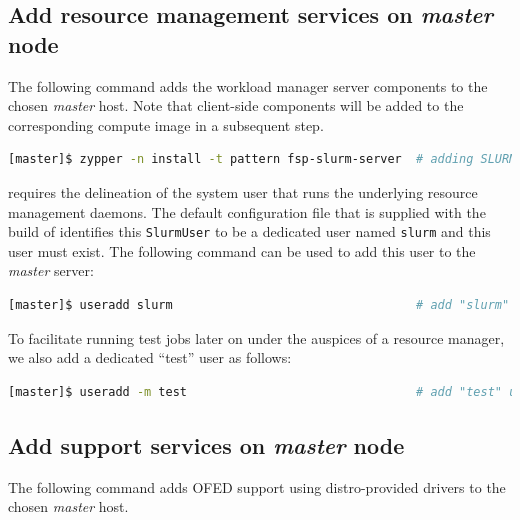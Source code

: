 \documentclass[letterpaper]{article}
\begin{document}
\subsection{Add resource management services on {\em master} node} \label{sec:add_rm}

The following command adds the \SLURM{} workload manager server components to the
chosen {\em master} host. Note that client-side components will be added to
the corresponding compute image in a subsequent step.

\begin{lstlisting}[language=bash,keywords={}]
[master]$ zypper -n install -t pattern fsp-slurm-server  # adding SLURM server support
\end{lstlisting}

\SLURM{} requires the delineation of the system user that runs the underlying
resource management daemons. The default configuration file that is supplied
with the \FSP{} build of \SLURM{} identifies this \texttt{SlurmUser} to be a
dedicated user named \texttt{slurm} and this user must exist. 
The following command can be used to add this user to the {\em
  master} server:

\begin{lstlisting}[language=bash,keywords={}]
[master]$ useradd slurm                                  # add "slurm" user
\end{lstlisting}

To facilitate running test jobs later on under the auspices of a resource
manager, we also add a dedicated ``test'' user as follows:

\begin{lstlisting}[language=bash,keywords={}]
[master]$ useradd -m test                                # add "test" user
\end{lstlisting}

\subsection{Add \InfiniBand{} support services on {\em master} node} \label{sec:add_ofed}

The following command adds OFED support using distro-provided drivers to the
chosen {\em master} host. 
\end{document}
